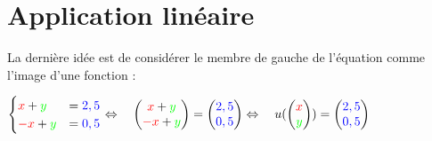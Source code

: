 \documentclass{book}
\begin{document}
\section{Application linéaire}
La dernière idée est de considérer le membre de gauche de l'équation comme l'image d'une fonction :
\begin{center}
$
\begin{cases}
{\color{red}x}+{\color{green}y}&={\color{blue}2,5}\\
{\color{red}-x}+{\color{green}y}&={\color{blue}0,5}
\end{cases}
\Leftrightarrow\quad \begin{pmatrix}
 {\color{red}x} +{\color{green}y}   \\
 {\color{red}-x} +{\color{green}y}   \\
\end{pmatrix} =\begin{pmatrix}
 {\color{blue}2,5}   \\
 {\color{blue}0,5}  \\
\end{pmatrix}
\Leftrightarrow\quad
u(\begin{pmatrix}
 \color{red}x     \\ {\color{green}y}   \\
\end{pmatrix})
	 = \begin{pmatrix}
 {\color{blue}2,5}   \\
 {\color{blue}0,5}  \\
\end{pmatrix}$\\
\end{center}
\end{document}
